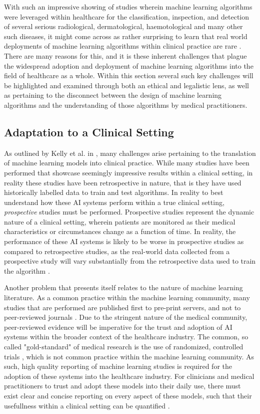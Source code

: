 \documentclass[a4paper]{article}
\begin{document}
With such an impressive showing of studies wherein machine learning algorithms were leveraged within healthcare for the classification, 
inspection, and detection of several serious radiological, dermatological, haemotological and many other such diseases, it might come across as rather
surprising to learn that real world deployments of machine learning algorithms within clinical practice are rare \cite{Kelly_2019}. There are many reasons for this,
and it is these inherent challenges that plague the widespread adoption and deployment of machine learning algorithms into the field of healthcare as a whole. Within this section
several such key challenges will be highlighted and examined through both an ethical and legalistic lens, as well as pertaining to the disconnect between the design of machine learning algorithms 
and the understanding of those algorithms by medical practitioners. 

\subsection{Adaptation to a Clinical Setting}

As outlined by Kelly et al. in \cite{Kelly_2019}, many challenges arise pertaining to the translation of machine learning models into clinical practice. While many studies have been performed that showcase 
seemingly impressive results within a clinical setting, in reality these studies have been retrospective in nature, that is they have used historically labelled data to train and test algorithms. In reality 
to best understand how these AI systems perform within a true clinical setting, \textit{prospective} studies must be performed. Prospective studies represent the dynamic nature of a clinical setting,
wherein patients are monitored as their medical characteristics or circumstances change as a function of time. In reality, the performance of these AI systems is likely to be worse in prospective studies 
as compared to retrospective studies, as the real-world data collected from a prospective study will vary substantially from the retrospective data used to train the algorithm \cite{Kelly_2019}. 

Another problem that presents itself relates to the nature of machine learning literature. As a common practice within the machine learning community, many studies that are performed are published first to pre-print servers, and not 
to peer-reviewed journals \cite{Kelly_2019}. Due to the stringent nature of the medical community, peer-reviewed evidence will be imperative for the trust and adoption of AI systems within the broader context of the healthcare industry.
The common, so called "gold-standard" of medical research is the use of randomized, controlled trials \cite{Kelly_2019,Khan_2023}, which is not common practice within the machine learning community. As such, high quality reporting of machine learning studies is required for the adoption of these systems into the healthcare industry. For clinicians and medical practitioners to trust and adopt these models into their daily use, there must exist clear and concise reporting on every aspect of these models, such that their usefullness within a clinical setting can be quantified \cite{Kelly_2019}. 
\end{document}
